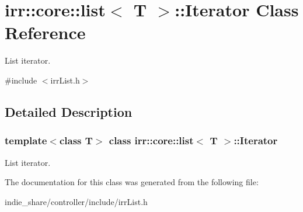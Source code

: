 \hypertarget{classirr_1_1core_1_1list_1_1Iterator}{}\section{irr\+:\+:core\+:\+:list$<$ T $>$\+:\+:Iterator Class Reference}
\label{classirr_1_1core_1_1list_1_1Iterator}


List iterator.  




{\ttfamily \#include $<$irr\+List.\+h$>$}



\subsection{Detailed Description}
\subsubsection*{template$<$class T$>$\newline
class irr\+::core\+::list$<$ T $>$\+::\+Iterator}

List iterator. 

The documentation for this class was generated from the following file\+:\begin{DoxyCompactItemize}
\item 
indie\+\_\+share/controller/include/irr\+List.\+h\end{DoxyCompactItemize}
